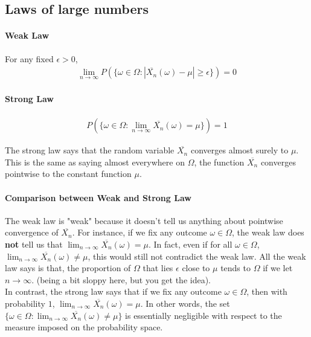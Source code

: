 \documentclass{article}
\begin{document}
\subsection{Laws of large numbers}
\paragraph{Weak Law}
For any fixed $\epsilon > 0$,
\begin{align*}
	\lim_{n\rightarrow \infty}P(\{\omega \in \Omega: |\overline{X_n}(\omega)-\mu|\geq \epsilon \}) = 0
\end{align*}

\paragraph{Strong Law}
\begin{align*}
	P(\{\omega \in \Omega: \lim_{n\rightarrow \infty}\overline{X_n}(\omega) = \mu \}) = 1
\end{align*}

The strong law says that the random variable $\overline{X_n}$ converges almost surely to $\mu$. This is the same as saying almost everywhere on $\Omega$, the function $\overline{X_n}$ converges pointwise to the constant function $\mu$.

\paragraph{Comparison between Weak and Strong Law}
The weak law is "weak" because it doesn't tell us anything about pointwise convergence of $\overline{X_n}$. For instance, if we fix any outcome $\omega \in \Omega$, the weak law does \textbf{not} tell us that $\lim_{n\rightarrow \infty}\overline{X_n}(\omega)=\mu$. In fact, even if for all $\omega \in \Omega$, $\lim_{n\rightarrow \infty}\overline{X_n}(\omega)\neq \mu$, this would still not contradict the weak law. All the weak law says is that, the proportion of $\Omega$ that lies $\epsilon$ close to $\mu$ tends to $\Omega$ if we let $n\rightarrow \infty$. (being a bit sloppy here, but you get the idea).
\\
In contrast, the strong law says that if we fix any outcome $\omega \in \Omega$, then with probability $1$, $\lim_{n\rightarrow \infty}\overline{X_n}(\omega)=\mu$. In other words, the set $\{\omega \in \Omega: \lim_{n\rightarrow \infty}\overline{X_n}(\omega) \neq \mu \}$ is essentially negligible with respect to the measure imposed on the probability space.
\end{document}
